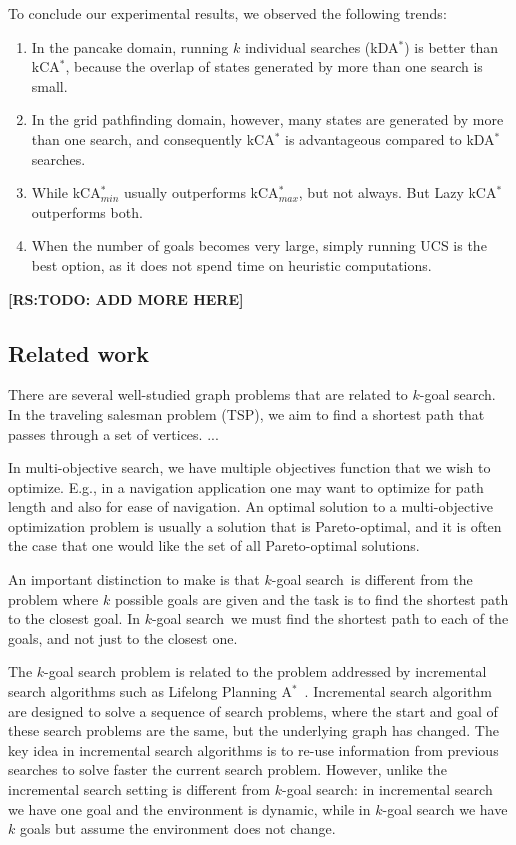 \documentclass{aicom2e}
\newcommand{\kgs}{$k$-goal search}
\newcommand{\astar}{A$^*$}
\newcommand{\kastar}{kCA$^*$}
\newcommand{\kastarmin}{kCA$^*_{min}$}
\newcommand{\kastarmax}{kCA$^*_{max}$}
\newcommand{\kxastar}{kDA$^*$}
\newcommand{\roni}[1]{\textbf{[RS:#1]}}
\begin{document}
To conclude our experimental results, we observed the following trends:
\begin{enumerate}

\item In the pancake domain, running $k$ individual searches (\kxastar{}) is better
than \kastar{}, because the overlap of states generated by more than one search
is small.

\item In the grid pathfinding domain, however, many states are generated by more than one search, and consequently \kastar{} is advantageous compared to \kxastar{} searches.

\item While \kastarmin{} usually outperforms \kastarmax{}, but not always. But Lazy \kastar{} outperforms both.

\item When the number of goals becomes very large, simply running UCS is the best option, as it does not spend time on heuristic computations.
\end{enumerate}

\roni{TODO: ADD MORE HERE}




\subsection{Related work}
\label{sec:related-work}


There are several well-studied graph problems that are related to $k$-goal
search. In the traveling salesman problem (TSP), we aim to find a shortest path
that passes through a set of vertices. ...


In multi-objective search, we have multiple objectives function that we wish to
optimize. E.g., in a navigation application one may want to optimize for path
length and also for ease of navigation. An optimal solution to a
multi-objective optimization problem is usually a solution that is
Pareto-optimal, and it is often the case that one would like the set of all
Pareto-optimal solutions.



An important distinction to make is that \kgs\ is different from the problem
where $k$ possible goals are given and the task is to find the shortest path to
the closest goal. In \kgs\ we must find the shortest path to each of the goals,
and not just to the closest one.



The \kgs{} problem is related to the problem addressed by incremental search
algorithms such as Lifelong Planning \astar{}~\cite{koenig2004lifelong}.
Incremental search algorithm are designed to solve a sequence of search
problems, where the start and goal of these search problems are the same, but
the underlying graph has changed. The key idea in incremental search algorithms
is to re-use information from previous searches to solve faster the current
search problem. However, unlike the incremental search setting is different
from \kgs{}: in incremental search we have one goal and the environment is
dynamic, while in \kgs{} we have $k$ goals but assume the environment does not
change.
\end{document}
